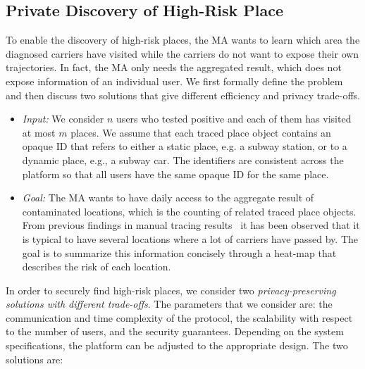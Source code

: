 \subsection{Private Discovery of High-Risk Place}

To enable the discovery of high-risk places,  the MA wants to learn which area the diagnosed carriers have visited while the  carriers do not want to expose their own trajectories. In fact, the MA only needs the aggregated result, which does not expose information of an individual user. 
We first formally define the problem and then discuss two solutions that give different efficiency and privacy trade-offs.

\begin{itemize}
    \item \emph{Input:} We consider $n$ users who tested positive and each of them has visited at most $m$ places. We assume that each traced place object contains an opaque ID that refers to either a static place, e.g. a subway station, or to a dynamic place, e.g., a subway car. The identifiers are consistent across the platform so that all users have the same opaque ID for the same place.
    \item \emph{Goal:} The MA wants to have daily access to the aggregate result of contaminated locations, which is the counting of related traced place objects. From previous findings in manual tracing results~\cite{fishstore} it has been observed that it is typical to have several locations where a lot of carriers have passed by. The goal is to summarize this information concisely through a heat-map that describes the risk of each location.  %
\end{itemize}

In order to securely find high-risk places, we consider two \emph{privacy-preserving solutions with different trade-offs}.
The parameters that we consider are: the communication and time complexity of the protocol, the scalability with respect to the number of users, and the security guarantees. 
Depending on the system specifications, the platform can be adjusted to the appropriate design. 
The two solutions are:


